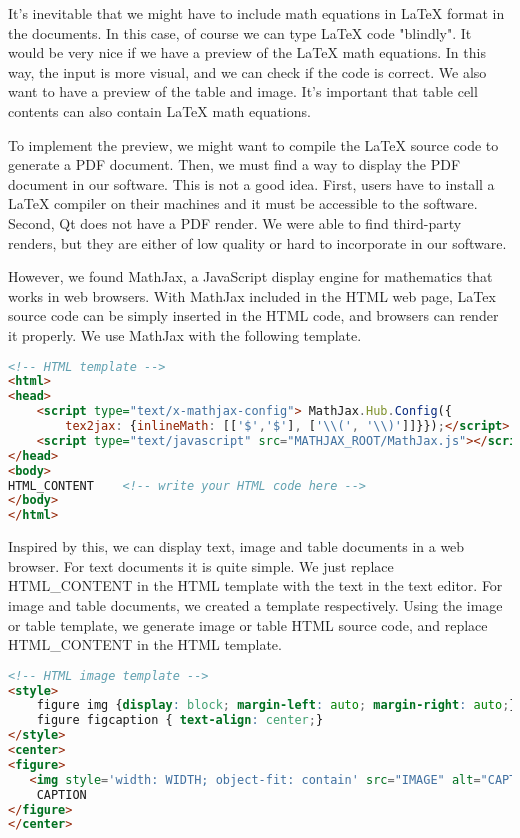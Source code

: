 It's inevitable that we might have to include math equations in LaTeX format in the documents. In this case, of course we can type LaTeX code "blindly". It would be very nice if we have a preview of the LaTeX math equations. In this way, the input is more visual, and we can check if the code is correct. We also want to have a preview of the table and image. It's important that table cell contents can also contain LaTeX math equations.

To implement the preview, we might want to compile the LaTeX source code to generate a PDF document. Then, we must find a way to display the PDF document in our software. This is not a good idea. First, users have to install a LaTeX compiler on their machines and it must be accessible to the software. Second, Qt does not have a PDF render. We were able to find third-party renders, but they are either of low quality or hard to incorporate in our software.

However, we found MathJax, a JavaScript display engine for mathematics that works in web browsers. With MathJax included in the HTML web page, LaTex source code can be simply inserted in the HTML code, and browsers can render it properly. We use MathJax with the following template.

\begin{lstlisting}[language=HTML]
<!-- HTML template -->
<html>
<head>
    <script type="text/x-mathjax-config"> MathJax.Hub.Config({
        tex2jax: {inlineMath: [['$','$'], ['\\(', '\\)']]}});</script>
    <script type="text/javascript" src="MATHJAX_ROOT/MathJax.js"></script>
</head>
<body>
HTML_CONTENT    <!-- write your HTML code here -->
</body>
</html>
\end{lstlisting}

Inspired by this, we can display text, image and table documents in a web browser. For text documents it is quite simple. We just replace HTML\_CONTENT in the HTML template with the text in the text editor. For image and table documents, we created a template respectively. Using the image or table template, we generate image or table HTML source code, and replace HTML\_CONTENT in the HTML template.

\begin{lstlisting}[language=html]
<!-- HTML image template -->
<style>
    figure img {display: block; margin-left: auto; margin-right: auto;}
    figure figcaption { text-align: center;}
</style>
<center>
<figure>
   <img style='width: WIDTH; object-fit: contain' src="IMAGE" alt="CAPTION"/>
    CAPTION
</figure>
</center>
\end{lstlisting}

